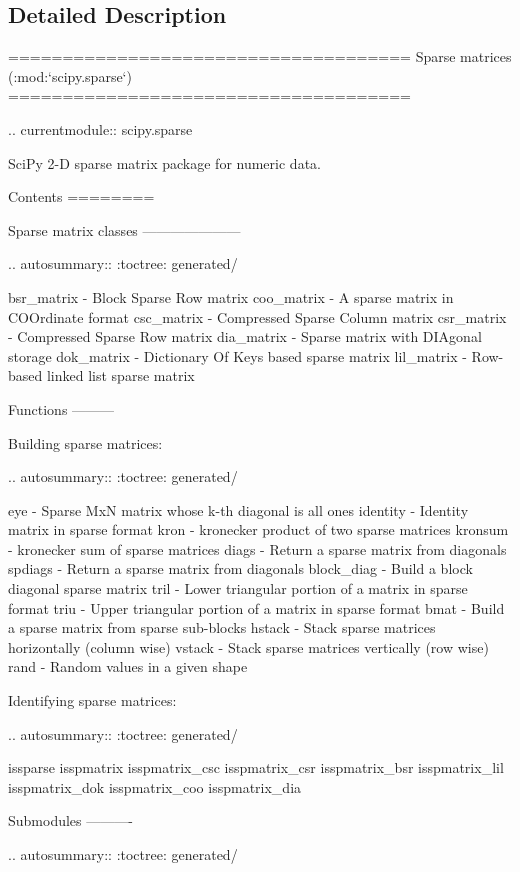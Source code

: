\subsection{Detailed Description}
\begin{DoxyVerb}=====================================
Sparse matrices (:mod:`scipy.sparse`)
=====================================

.. currentmodule:: scipy.sparse

SciPy 2-D sparse matrix package for numeric data.

Contents
========

Sparse matrix classes
---------------------

.. autosummary::
   :toctree: generated/

   bsr_matrix - Block Sparse Row matrix
   coo_matrix - A sparse matrix in COOrdinate format
   csc_matrix - Compressed Sparse Column matrix
   csr_matrix - Compressed Sparse Row matrix
   dia_matrix - Sparse matrix with DIAgonal storage
   dok_matrix - Dictionary Of Keys based sparse matrix
   lil_matrix - Row-based linked list sparse matrix

Functions
---------

Building sparse matrices:

.. autosummary::
   :toctree: generated/

   eye - Sparse MxN matrix whose k-th diagonal is all ones
   identity - Identity matrix in sparse format
   kron - kronecker product of two sparse matrices
   kronsum - kronecker sum of sparse matrices
   diags - Return a sparse matrix from diagonals
   spdiags - Return a sparse matrix from diagonals
   block_diag - Build a block diagonal sparse matrix
   tril - Lower triangular portion of a matrix in sparse format
   triu - Upper triangular portion of a matrix in sparse format
   bmat - Build a sparse matrix from sparse sub-blocks
   hstack - Stack sparse matrices horizontally (column wise)
   vstack - Stack sparse matrices vertically (row wise)
   rand - Random values in a given shape

Identifying sparse matrices:

.. autosummary::
   :toctree: generated/

   issparse
   isspmatrix
   isspmatrix_csc
   isspmatrix_csr
   isspmatrix_bsr
   isspmatrix_lil
   isspmatrix_dok
   isspmatrix_coo
   isspmatrix_dia

Submodules
----------

.. autosummary::
   :toctree: generated/


\end{DoxyVerb}
